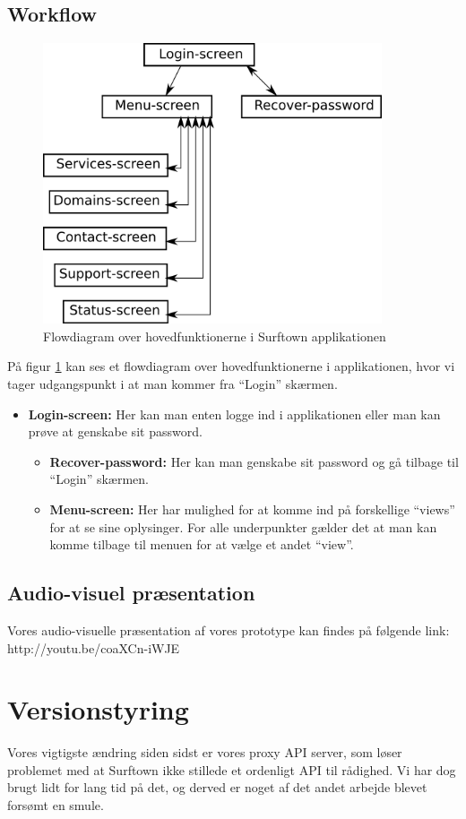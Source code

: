 \documentclass[12pt]{article}
\begin{document}
\subsection{Workflow}
\begin{figure}[h]
	\includegraphics[width=10cm]{flow.png}
	\caption{Flowdiagram over hovedfunktionerne i Surftown applikationen}
	\label{flow}
\end{figure}
På figur \ref{flow} kan ses et flowdiagram over hovedfunktionerne i applikationen, hvor vi tager udgangspunkt i at man kommer fra ``Login'' skærmen.
\begin{itemize}
	\item \textbf{Login-screen: } Her kan man enten logge ind i applikationen eller man kan prøve at genskabe sit password.
	\begin{itemize}
		\item \textbf{Recover-password: } Her kan man genskabe sit password og gå tilbage til ``Login'' skærmen.
		\item \textbf{Menu-screen: } Her har mulighed for at komme ind på forskellige ``views'' for at se sine oplysinger. For alle underpunkter gælder det at man kan komme tilbage til menuen for at vælge et andet ``view''.	
	\end{itemize}
\end{itemize}
\subsection{Audio-visuel præsentation}
Vores audio-visuelle præsentation af vores prototype kan findes på følgende link: http://youtu.be/coaXCn-iWJE
\section{Versionstyring}
Vores vigtigste ændring siden sidst er vores proxy API server, som løser problemet med at Surftown ikke stillede et ordenligt API til rådighed. Vi har dog brugt lidt for lang tid på det, og derved er noget af det andet arbejde blevet forsømt en smule.
\end{document}
